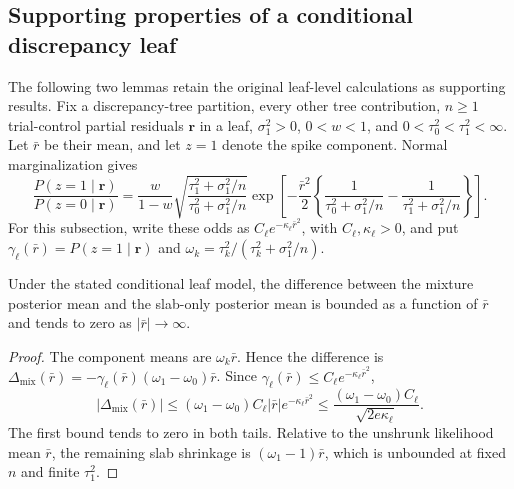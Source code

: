 \subsection{Supporting properties of a conditional discrepancy leaf}\label{sec:C.5}
The following two lemmas retain the original leaf-level calculations as supporting results. Fix a discrepancy-tree partition, every other tree contribution, $n\geq1$ trial-control partial residuals $\mathbf r$ in a leaf, $\sigma_1^2>0$, $0<w<1$, and $0<\tau_0^2<\tau_1^2<\infty$. Let $\bar r$ be their mean, and let $z=1$ denote the spike component. Normal marginalization gives
\begin{equation}\label{eq:odds}
\frac{P(z=1\mid\mathbf r)}{P(z=0\mid\mathbf r)}
=\frac{w}{1-w}\sqrt{\frac{\tau_1^2+\sigma_1^2/n}{\tau_0^2+\sigma_1^2/n}}
\exp\left[-\frac{\bar r^2}{2}
\left\{\frac{1}{\tau_0^2+\sigma_1^2/n}-\frac{1}{\tau_1^2+\sigma_1^2/n}\right\}\right].
\end{equation}
For this subsection, write these odds as $C_{\ell}e^{-\kappa_{\ell}\bar r^2}$, with $C_{\ell},\kappa_{\ell}>0$, and put $\gamma_{\ell}(\bar r)=P(z=1\mid\mathbf r)$ and $\omega_k=\tau_k^2/(\tau_k^2+\sigma_1^2/n)$.

\begin{lemma}\label{lem:leaf_shrinkage}
Under the stated conditional leaf model, the difference between the mixture posterior mean and the slab-only posterior mean is bounded as a function of $\bar r$ and tends to zero as $|\bar r|\to\infty$.
\end{lemma}
\begin{proof}
The component means are $\omega_k\bar r$. Hence the difference is $\Delta_{\mathrm{mix}}(\bar r)=-\gamma_{\ell}(\bar r)(\omega_1-\omega_0)\bar r$. Since $\gamma_{\ell}(\bar r)\leq C_{\ell}e^{-\kappa_{\ell}\bar r^2}$,
\[
|\Delta_{\mathrm{mix}}(\bar r)|\leq(\omega_1-\omega_0)C_{\ell}|\bar r|e^{-\kappa_{\ell}\bar r^2}
\leq\frac{(\omega_1-\omega_0)C_{\ell}}{\sqrt{2e\kappa_{\ell}}}.
\]
The first bound tends to zero in both tails. Relative to the unshrunk likelihood mean $\bar r$, the remaining slab shrinkage is $(\omega_1-1)\bar r$, which is unbounded at fixed $n$ and finite $\tau_1^2$.
\end{proof}

